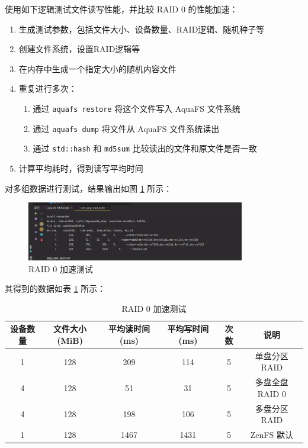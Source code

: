 使用如下逻辑测试文件读写性能，并比较 RAID 0 的性能加速：

\begin{enumerate}
  \item 生成测试参数，包括文件大小、设备数量、RAID逻辑、随机种子等
  \item 创建文件系统，设置RAID逻辑等
  \item 在内存中生成一个指定大小的随机内容文件
  \item 重复进行多次：
  \begin{enumerate}
    \item 通过 \verb|aquafs restore| 将这个文件写入 AquaFS 文件系统
    \item 通过 \verb|aquafs dump| 将文件从 AquaFS 文件系统读出
    \item 通过 \verb|std::hash| 和 \verb|md5sum| 比较读出的文件和原文件是否一致
  \end{enumerate}
  \item 计算平均耗时，得到读写平均时间
\end{enumerate}

对多组数据进行测试，结果输出如图 \ref{raid0-speedup} 所示：

\begin{figure}[htbp]
  \centering
  \includegraphics[width=0.85\textwidth]{fig/raid0-speedup.png}
  \caption{ RAID 0 加速测试 }
  \label{raid0-speedup}
\end{figure}

其得到的数据如表 \ref{raid0-speedup-table} 所示：

\begin{table}[htbp]
  \centering
  \caption{RAID 0 加速测试}
  \label{raid0-speedup-table}
  \begin{tabular}{cccccc}
    \hline
    \textbf{设备数量} & \textbf{文件大小(MiB)} & \textbf{平均读时间(ms)} & \textbf{平均写时间(ms)} & \textbf{次数} & \textbf{说明} \\
    \hline
    1 & 128 & 209 & 114 & 5 & 单盘分区 RAID \\
    4 & 128 & 51 & 31 & 5 &  多盘全盘 RAID 0 \\
    4 & 128 & 198 & 106 & 5 &  多盘分区 RAID \\
    1 & 128 & 1467 & 1431 & 5 &  ZenFS 默认 \\
    \hline
  \end{tabular}
\end{table}

